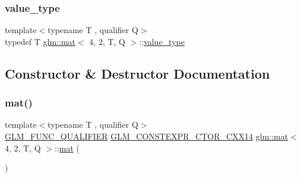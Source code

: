 \mbox{\label{structglm_1_1mat_3_014_00_012_00_01_t_00_01_q_01_4_aad6b55a7bcab7ce036cd5d5f5b963c6e}} 
\subsubsection{\texorpdfstring{value\+\_\+type}{value\_type}}
{\footnotesize\ttfamily template$<$typename T , qualifier Q$>$ \\
typedef T \mbox{\hyperlink{structglm_1_1mat}{glm\+::mat}}$<$ 4, 2, T, Q $>$\+::\mbox{\hyperlink{structglm_1_1mat_3_014_00_012_00_01_t_00_01_q_01_4_aad6b55a7bcab7ce036cd5d5f5b963c6e}{value\+\_\+type}}}



\subsection{Constructor \& Destructor Documentation}
\mbox{\label{structglm_1_1mat_3_014_00_012_00_01_t_00_01_q_01_4_ad00ae33ce233ac098c9d6ff11fe709a7}} 
\subsubsection{\texorpdfstring{mat()}{mat()}\hspace{0.1cm}{\footnotesize\ttfamily [1/21]}}
{\footnotesize\ttfamily template$<$typename T , qualifier Q$>$ \\
\mbox{\hyperlink{setup_8hpp_a33fdea6f91c5f834105f7415e2a64407}{G\+L\+M\+\_\+\+F\+U\+N\+C\+\_\+\+Q\+U\+A\+L\+I\+F\+I\+ER}} \mbox{\hyperlink{setup_8hpp_a0900f9145e68bf6061b6f5e7be3fa751}{G\+L\+M\+\_\+\+C\+O\+N\+S\+T\+E\+X\+P\+R\+\_\+\+C\+T\+O\+R\+\_\+\+C\+X\+X14}} \mbox{\hyperlink{structglm_1_1mat}{glm\+::mat}}$<$ 4, 2, T, Q $>$\+::\mbox{\hyperlink{structglm_1_1mat}{mat}} (\begin{DoxyParamCaption}{ }\end{DoxyParamCaption})}

\mbox{\label{structglm_1_1mat_3_014_00_012_00_01_t_00_01_q_01_4_a0713be6991a8f52680ba77634bc88c5b}} 

